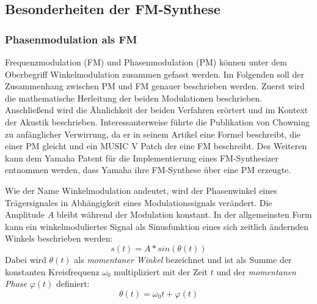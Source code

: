 \subsection{Besonderheiten der FM-Synthese}
\FloatBarrier
\subsubsection{Phasenmodulation als FM}
Frequenzmodulation (FM) und Phasenmodulation (PM) können unter dem Oberbegriff Winkelmodulation zusammen gefasst werden. Im Folgenden soll der Zusammenhang zwischen PM und FM genauer beschrieben werden. Zuerst wird die mathematische Herleitung der beiden Modulationen beschrieben. Anschließend wird die Ähnlichkeit der beiden Verfahren erörtert und im Kontext der Akustik beschrieben. Interessanterweise führte die Publikation von Chowning zu anfänglicher Verwirrung, da er in seinem Artikel eine Formel beschreibt, die einer PM gleicht und ein MUSIC V Patch der eine FM beschreibt. \cite{rossum1999method} Des Weiteren kann dem Yamaha Patent für die Implementierung eines FM-Synthesizer entnommen werden, dass Yamaha ihre FM-Synthese über eine PM erzeugte. \cite{oya1987electronic} 

Wie der Name Winkelmodulation andeutet, wird der Phasenwinkel eines Trägersignales in Abhängigkeit eines Modulationssignals verändert. Die Amplitude \(A\) bleibt während der Modulation konstant. In der allgemeinsten Form kann ein winkelmoduliertes Signal als Sinusfunktion eines sich zeitlich ändernden Winkels beschrieben werden:
\begin{equation}
s(t)=A*sin(\theta(t))
\label{eq:signal_basis_funktion}
\end{equation}
Dabei wird \(\theta(t)\) als \textit{momentaner Winkel} bezeichnet und ist als Summe der konstanten Kreisfrequenz $\omega_0$ multipliziert mit der Zeit $t$ und der \textit{momentanen Phase} $\varphi(t)$ definiert:
\begin{equation*}
\theta(t)=\omega_0t + \varphi(t)
\end{equation*}

